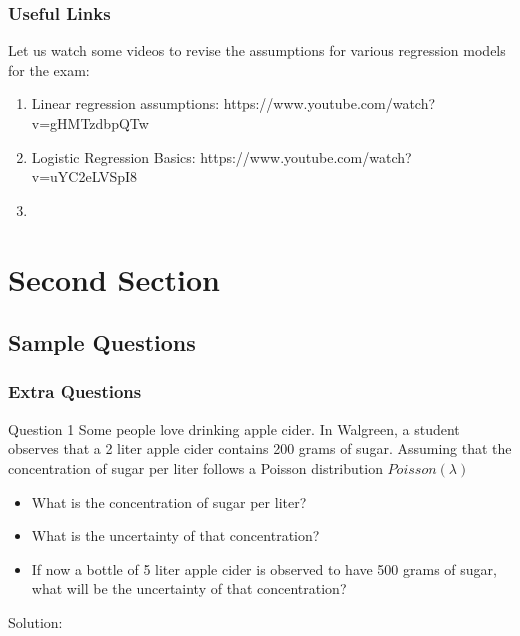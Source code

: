 \documentclass{beamer}
\begin{document}
\begin{frame}
\frametitle{Useful Links}

Let us watch some videos to revise the assumptions for various regression models for the exam:

\begin{enumerate}
\item Linear regression assumptions: https://www.youtube.com/watch?v=gHMTzdbpQTw

\item Logistic Regression Basics: https://www.youtube.com/watch?v=uYC2eLVSpI8

\item
\end{enumerate}
\end{frame}



\section{Second Section}
\subsection{Sample Questions}




\begin{frame}
\frametitle{Extra Questions}
\begin{block}{Question 1}
Some people love drinking apple cider. In Walgreen, a student observes that a 2 liter apple cider contains 200 grams of sugar. Assuming that the concentration of sugar per liter follows a Poisson distribution $Poisson(\lambda)$
\begin{itemize}
\item What is the concentration of sugar per liter?
\item What is the uncertainty of that concentration?
\item If now a bottle of 5 liter apple cider is observed to have 500 grams of sugar, what will be the uncertainty of that concentration?
\end{itemize}
\end{block}

\begin{block}{Solution:}

\end{block}


\end{frame}
\end{document}
